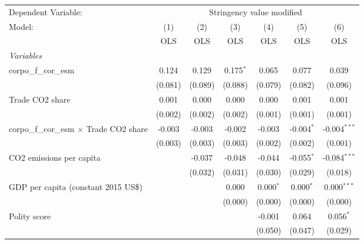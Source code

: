 
\begingroup
\centering
\begin{tabular}{lcccccc}
   \toprule
   Dependent Variable: & \multicolumn{6}{c}{Stringency value modified}\\
   Model:                                          & (1)     & (2)     & (3)         & (4)         & (5)          & (6)\\  
                                                   &  OLS    & OLS     & OLS         & OLS         & OLS          & OLS\\  
   \midrule
   \emph{Variables}\\
   corpo\_f\_cor\_esm                              & 0.124   & 0.129   & 0.175$^{*}$ & 0.065       & 0.077        & 0.039\\   
                                                   & (0.081) & (0.089) & (0.088)     & (0.079)     & (0.082)      & (0.096)\\   
   Trade CO2 share                                 & 0.001   & 0.000   & 0.000       & 0.000       & 0.001        & 0.001\\   
                                                   & (0.002) & (0.002) & (0.002)     & (0.001)     & (0.001)      & (0.001)\\   
   corpo\_f\_cor\_esm $\times$ Trade CO2 share     & -0.003  & -0.003  & -0.002      & -0.003      & -0.004$^{*}$ & -0.004$^{***}$\\   
                                                   & (0.003) & (0.003) & (0.003)     & (0.002)     & (0.002)      & (0.001)\\   
   CO2 emissions per capita                        &         & -0.037  & -0.048      & -0.044      & -0.055$^{*}$ & -0.084$^{***}$\\   
                                                   &         & (0.032) & (0.031)     & (0.030)     & (0.029)      & (0.018)\\   
   GDP per capita (constant 2015 US\$)             &         &         & 0.000       & 0.000$^{*}$ & 0.000$^{*}$  & 0.000$^{***}$\\   
                                                   &         &         & (0.000)     & (0.000)     & (0.000)      & (0.000)\\   
   Polity score                                    &         &         &             & -0.001      & 0.064        & 0.056$^{*}$\\   
                                                   &         &         &             & (0.050)     & (0.047)      & (0.029)\\   

\end{tabular}
